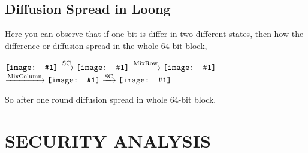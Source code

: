 \documentclass[preprint]{transcrypto}
\newcommand{\TeaserImage}[1]{\vcenter{\hbox{\texttt{[image: \#1]}}}}
\begin{document}
\subsection{Diffusion Spread in Loong}
Here you can observe that if one bit is differ in two different states, then how the difference or diffusion spread in the whole 64-bit block,
\begin{center}
      $\TeaserImage{a1b.png} \xrightarrow{\text{SC}} \TeaserImage{a1b.png}
        \xrightarrow{\text{MixRow}} \TeaserImage{3.png} $
        $\xrightarrow{\text{MixColumn}}
        \TeaserImage{a1d.png} \xrightarrow{\text{SC}}\TeaserImage{a1d.png}$
 \end{center}
So after one round diffusion spread in whole 64-bit block.






\section{SECURITY ANALYSIS}
\end{document}
